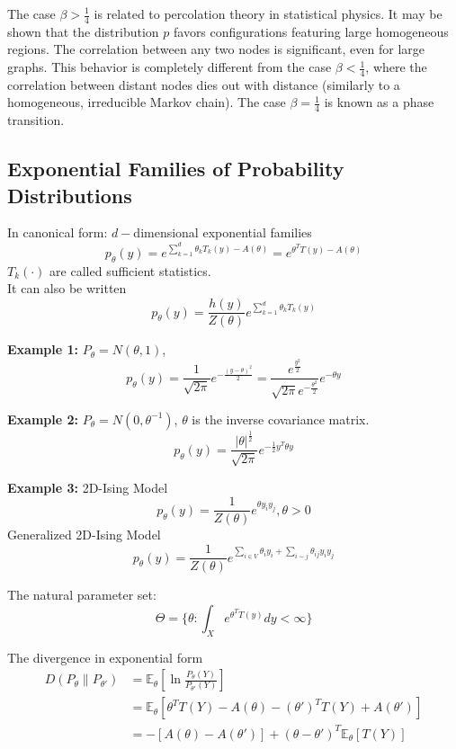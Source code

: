 \documentclass[11pt,a4paper]{article}
\begin{document}
The case $\beta>\frac{1}{4}$ is related to percolation theory in statistical physics. It may be shown that the distribution $p$ favors configurations featuring large homogeneous regions. The correlation between any two nodes is significant, even for large graphs. This behavior is completely different from the case $\beta<\frac{1}{4}$, where the correlation between distant nodes dies out with distance (similarly to a homogeneous, irreducible Markov chain). The case $\beta=\frac{1}{4}$ is known as a phase transition.

\subsection{Exponential Families of Probability Distributions}
In canonical form: $d-$dimensional exponential families
$$p_\theta(y)=e^{\sum_{k=1}^d\theta_k T_k(y)-A(\theta)}=e^{\theta^T T(y)-A(\theta)}$$
$T_k (\cdot)$ are called sufficient statistics.\\
It can also be written
$$p_\theta(y)=\frac{h(y)}{Z(\theta)} e^{\sum_{k=1}^d\theta_k T_k(y)}$$

\textbf{Example 1:} $P_\theta=N(\theta,1)$, $$p_\theta(y)=\frac{1}{\sqrt{2\pi}}e^{-\frac{(y-\theta)^2}{2}}=\frac{e^{\frac{y^2}{2}}}{\sqrt{2\pi}e^{-\frac{\theta^2}{2}}}e^{-\theta y}$$

\textbf{Example 2:} $P_\theta=N(0,\theta^{-1})$, $\theta$ is the inverse covariance matrix. $$p_\theta(y)=\frac{|\theta|^{\frac{1}{2}}}{\sqrt{2\pi}}e^{-\frac{1}{2}y^T\theta y}$$

\textbf{Example 3:} 2D-Ising Model $$p_\theta(y)=\frac{1}{Z(\theta)}e^{\theta y_iy_j},\theta>0$$
Generalized 2D-Ising Model $$p_\theta(y)=\frac{1}{Z(\theta)}e^{\sum_{i\in V}\theta_i y_i +\sum _{i\sim j}\theta_{ij} y_iy_j}$$

The natural parameter set:
$$\Theta=\{\theta:\int_X e^{\theta^T T(y)}dy<\infty\}$$

The divergence in exponential form
\begin{equation}
    \begin{aligned}
        D(P_\theta\| P_{\theta'})&=\mathbb{E}_\theta \left[\ln \frac{P_\theta (Y)}{P_{\theta'} (Y)}\right]\\
        &=\mathbb{E}_\theta[\theta^T T(Y)-A(\theta)-(\theta')^T T(Y)+A(\theta')]\\
        &=-[A(\theta)-A(\theta')]+(\theta-\theta')^T \mathbb{E}_\theta [T(Y)]
    \end{aligned}
    \nonumber
\end{equation}
\end{document}
